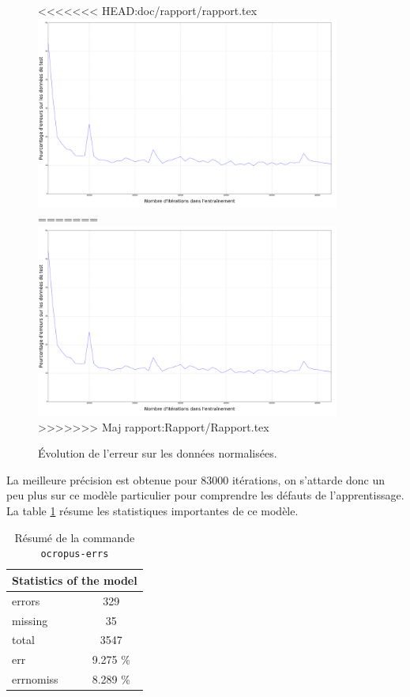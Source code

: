 \documentclass{article}
\begin{document}
\begin{figure}[!h] 
    \center
<<<<<<< HEAD:doc/rapport/rapport.tex
    \includegraphics[width=10cm]{error_normalized.png}
=======
    \includegraphics[width=10cm]{../Screenshots/error_normalized.png}
>>>>>>>  Maj rapport:Rapport/Rapport.tex
    \caption{Évolution de l'erreur sur les données normalisées.}
    \label{err_norm}
\end{figure}

La meilleure précision est obtenue pour 83000 itérations, on s'attarde donc un peu plus sur ce modèle particulier pour comprendre les défauts de l'apprentissage. La table \ref{t1} résume les statistiques importantes de ce modèle. \\

\begin{table}[!h]
    \centering
    \begin{tabular}{|l|l|lc|l|l|}
        \hline
        \multicolumn{6}{|c|}{\cellcolor[gray]{0.8}Statistics of the model}                   \\ \hline
        \multicolumn{3}{|l|}{errors}    & \multicolumn{3}{c|}{329}      \\ \hline
        \multicolumn{3}{|l|}{missing}   & \multicolumn{3}{c|}{35}       \\ \hline
        \multicolumn{3}{|l|}{total}     & \multicolumn{3}{c|}{3547}     \\ \hline
        \multicolumn{3}{|l|}{err}       & \multicolumn{3}{c|}{9.275 \%} \\ \hline
        \multicolumn{3}{|l|}{errnomiss} & \multicolumn{3}{c|}{8.289 \%} \\ \hline
    \end{tabular}
    \caption{Résumé de la commande \texttt{ocropus-errs}}
    \label{t1}
\end{table}
\end{document}
